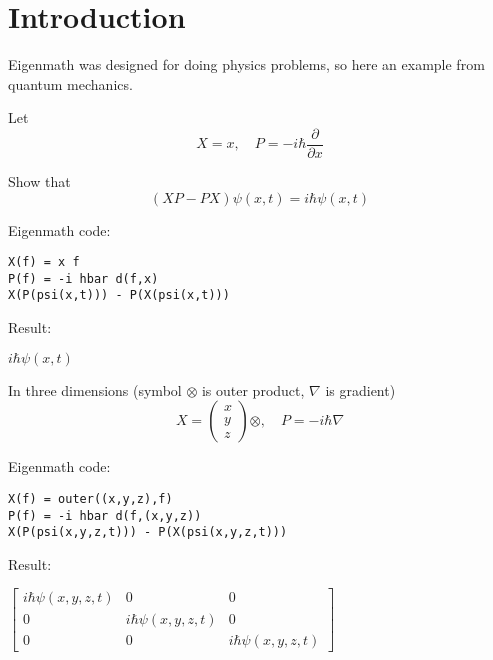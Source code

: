 

\section*{Introduction}

Eigenmath was designed for doing physics problems,
so here an example from quantum mechanics.

\bigskip
Let
\begin{equation*}
X=x,\quad P=-i\hbar\frac{\partial}{\partial x}
\end{equation*}

Show that
\begin{equation*}
(XP-PX)\psi(x,t)=i\hbar\psi(x,t)
\end{equation*}

Eigenmath code:
{\color{blue}
\begin{verbatim}
X(f) = x f
P(f) = -i hbar d(f,x)
X(P(psi(x,t))) - P(X(psi(x,t)))
\end{verbatim}}

Result:

\bigskip
$i\hbar\psi(x,t)$

\bigskip
In three dimensions (symbol $\otimes$ is outer product, $\nabla$ is gradient)
\begin{equation*}
X=\begin{pmatrix}x\\y\\z\end{pmatrix}\otimes,\quad P=-i\hbar\nabla
\end{equation*}

Eigenmath code:
{\color{blue}
\begin{verbatim}
X(f) = outer((x,y,z),f)
P(f) = -i hbar d(f,(x,y,z))
X(P(psi(x,y,z,t))) - P(X(psi(x,y,z,t)))
\end{verbatim}}

Result:

\bigskip
$\begin{bmatrix}
i\hbar\psi(x,y,z,t)&0&0\\
0&i\hbar\psi(x,y,z,t)&0\\
0&0&i\hbar\psi(x,y,z,t)
\end{bmatrix}
$



